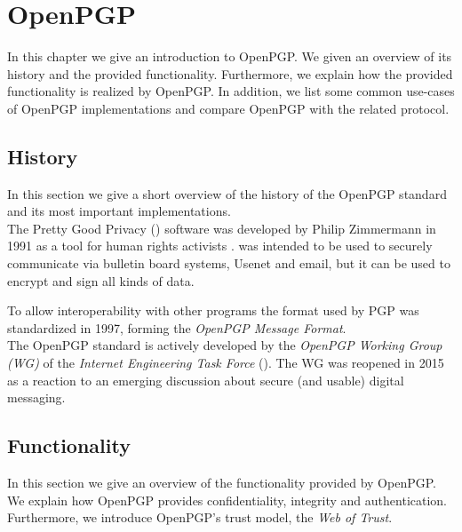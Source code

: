 \chapter{OpenPGP} \label{chapter:openpgp}

In this chapter we give an introduction to OpenPGP. We given an overview of its history and the provided functionality. Furthermore, we explain how the provided functionality is realized by OpenPGP. In addition, we list some common use-cases of OpenPGP implementations and compare OpenPGP with the related  protocol. 


\section{History}  \label{section:openpgp:history}

In this section we give a short overview of the history of the OpenPGP standard and its most important implementations. \\


The Pretty Good Privacy () software was developed by Philip Zimmermann in 1991 \cite{PGP1} as a tool for human rights activists \cite{PGP2}.  was intended to be used to securely communicate via bulletin board systems, Usenet and email, but it can be used to encrypt and sign all kinds of data.

To allow interoperability with other programs the format used by PGP was standardized in 1997, forming the \textit{OpenPGP Message Format}. \\


The OpenPGP standard is actively developed by the \textit{OpenPGP Working Group (WG)} of the \textit{Internet Engineering Task Force} (). The WG was reopened in 2015 as a reaction to an emerging discussion about secure (and usable) digital messaging.

\section{Functionality} \label{section:openpgp:functionality}

In this section we give an overview of the functionality provided by OpenPGP. We explain how OpenPGP provides confidentiality, integrity and authentication. Furthermore, we introduce OpenPGP's trust model, the \textit{Web of Trust}.  \\


